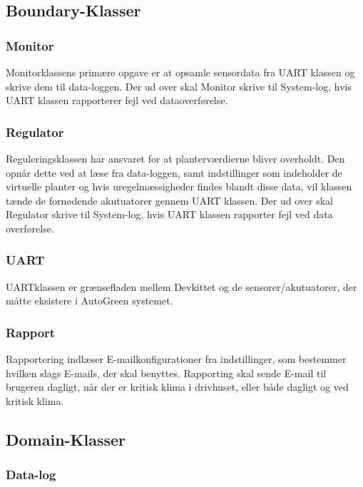 \subsection{Boundary-Klasser}

\subsubsection{Monitor}

Monitorklassens primære opgave er at opsamle sensordata fra UART klassen og skrive dem til data-loggen. Der ud over skal Monitor skrive til System-log, hvis UART klassen rapporterer fejl ved dataoverførelse.

\subsubsection{Regulator}

Reguleringsklassen har ansvaret for at planterværdierne bliver overholdt. Den opnår dette ved at læse fra data-loggen, samt indstillinger som indeholder de virtuelle planter og hvis uregelmæssigheder findes blandt disse data, vil klassen tænde de fornødende akutuatorer gennem UART klassen. Der ud over skal Regulator skrive til System-log, hvis UART klassen rapporter fejl ved data overførelse.

\subsubsection{UART}

UARTklassen er grænsefladen mellem Devkittet og de sensorer/akutuatorer, der måtte eksistere i AutoGreen systemet.

\subsubsection{Rapport}

Rapportering indlæser E-mailkonfigurationer fra indstillinger, som bestemmer hvilken slags E-mails, der skal benyttes. Rapporting skal sende E-mail til brugeren dagligt, når der er kritisk klima i drivhuset, eller både dagligt og ved kritisk klima.

\subsection{Domain-Klasser}

\subsubsection{Data-log}

